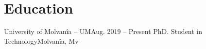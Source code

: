 
\section{Education}

\resumeSubHeadingListStart
  \resumeSubheading
  {University of Molvanîa -- UM}{Aug. 2019 -- Present}
  {PhD. Student in Technology}{Molvanîa, Mv}

\resumeSubHeadingListEnd
